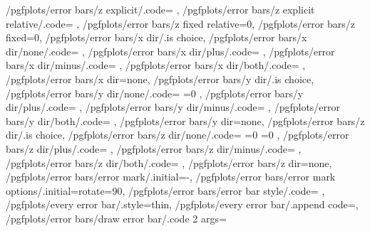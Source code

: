 {	/pgfplots/error bars/z explicit/.code=			\def\pgfplots@errorbars@zmode{2},
	/pgfplots/error bars/z explicit relative/.code=	\def\pgfplots@errorbars@zmode{3},
	/pgfplots/error bars/z fixed relative=0,
	/pgfplots/error bars/z fixed=0,
	/pgfplots/error bars/x dir/.is choice,
	/pgfplots/error bars/x dir/none/.code={%
		\def\pgfplots@errorbars@xdirection{0}%
		\ifnum{}
			\ifnum{}
				\pgfplots@errorbars@enabledfalse
			\fi
		\fi
	},
	/pgfplots/error bars/x dir/plus/.code=				\def\pgfplots@errorbars@xdirection{1}\pgfplots@errorbars@enabledtrue,
	/pgfplots/error bars/x dir/minus/.code=				\def\pgfplots@errorbars@xdirection{2}\pgfplots@errorbars@enabledtrue,
	/pgfplots/error bars/x dir/both/.code=				\def\pgfplots@errorbars@xdirection{3}\pgfplots@errorbars@enabledtrue,
	/pgfplots/error bars/x dir=none,
	/pgfplots/error bars/y dir/.is choice,
	/pgfplots/error bars/y dir/none/.code={%
		\def\pgfplots@errorbars@ydirection{0}%
		\ifnum\pgfplots@errorbars@xdirection=0
			\ifnum{}
				\pgfplots@errorbars@enabledfalse
			\fi
		\fi
	},
	/pgfplots/error bars/y dir/plus/.code=				\def\pgfplots@errorbars@ydirection{1}\pgfplots@errorbars@enabledtrue,
	/pgfplots/error bars/y dir/minus/.code=				\def\pgfplots@errorbars@ydirection{2}\pgfplots@errorbars@enabledtrue,
	/pgfplots/error bars/y dir/both/.code=				\def\pgfplots@errorbars@ydirection{3}\pgfplots@errorbars@enabledtrue,
	/pgfplots/error bars/y dir=none,
	/pgfplots/error bars/z dir/.is choice,
	/pgfplots/error bars/z dir/none/.code={%
		\def\pgfplots@errorbars@zdirection{0}%
		\ifnum\pgfplots@errorbars@xdirection=0
			\ifnum\pgfplots@errorbars@ydirection=0
				\pgfplots@errorbars@enabledfalse
			\fi
		\fi
	},
	/pgfplots/error bars/z dir/plus/.code=				\def\pgfplots@errorbars@zdirection{1}\pgfplots@errorbars@enabledtrue,
	/pgfplots/error bars/z dir/minus/.code=				\def\pgfplots@errorbars@zdirection{2}\pgfplots@errorbars@enabledtrue,
	/pgfplots/error bars/z dir/both/.code=				\def\pgfplots@errorbars@zdirection{3}\pgfplots@errorbars@enabledtrue,
	/pgfplots/error bars/z dir=none,
	/pgfplots/error bars/error mark/.initial={-},
	/pgfplots/error bars/error mark options/.initial={rotate=90},
	/pgfplots/error bars/error bar style/.code={%
	},
	/pgfplots/every error bar/.style={thin},
	/pgfplots/every error bar/.append code={},
	/pgfplots/error bars/draw error bar/.code 2 args={%
}}
